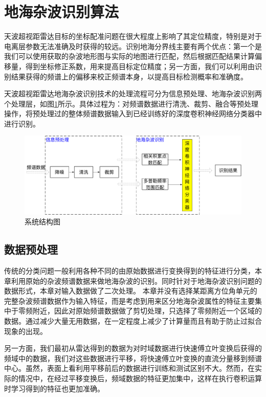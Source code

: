 \section{地海杂波识别算法}
天波超视距雷达目标的坐标配准问题在很大程度上影响了其定位精度，特别是对于电离层参数无法准确及时获得的较远。识别地海分界线主要有两个优点：第一个是我们可以使用获取的杂波地形图与实际的地图进行匹配，然后根据匹配结果计算偏移量，得到坐标修正系数，用来提高目标定位精度；另一方面，我们可以利用由识别结果获得的频谱上的偏移来校正频谱本身，以提高目标检测概率和准确度。

天波超视距雷达地海杂波识别技术的处理流程可分为信息预处理、地海杂波识别两个处理层，如图\ref{fig:system}所示。具体过程为：对频谱数据进行清洗、裁剪、融合等预处理操作，将预处理过的整体频谱数据输入到已经训练好的深度卷积神经网络分类器中进行识别。

\begin{figure}[H]
	\centering
	\includegraphics[width=13.5cm]{figures/othr/system}
	\caption{系统结构图}
	\label{fig:system}
\end{figure}

\subsection{数据预处理}
传统的分类问题一般利用各种不同的由原始数据进行变换得到的特征进行分类，本章利用原始的杂波频谱数据来做地海杂波的识别。同时针对于地海杂波识别问题的数据形式，本章对输入数据做了二次处理。
本章并没有选择某距离方位角单元的完整杂波频谱数据作为输入特征，而是考虑到用来区分地海杂波属性的特征主要集中于零频附近，因此对原始频谱数据做了剪切处理，只选择了零频附近一个区域的数据。通过减少大量无用数据，在一定程度上减少了计算量而且有助于防止过拟合现象的出现。

另一方面，我们最初从雷达得到的数据为对时域数据进行快速傅立叶变换后获得的频域中的数据，我们对这些数据进行平移，将快速傅立叶变换的直流分量移到频谱中心。虽然，表面上看利用平移前后的数据进行训练和测试区别不大。然而，在实际的情况中，在经过平移变换后，频域数据的特征更加集中，这样在执行卷积运算时学习得到的特征也更加准确。

